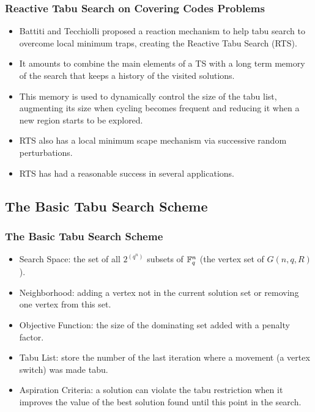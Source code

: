 \documentclass{beamer}
\begin{document}
\begin{frame}
  \frametitle{Reactive Tabu Search on Covering Codes Problems}
{
	
\begin{itemize}
    \item<1-> Battiti and Tecchiolli proposed a reaction mechanism to help tabu search to overcome local minimum traps, creating the Reactive Tabu Search (RTS).
    \item<2-> It amounts to combine the main elements of a TS with a long term memory of the search that keeps a history of the visited solutions.	
	\item<3-> This memory is used to dynamically control the size of the tabu list, augmenting its size when cycling becomes frequent and reducing it when a new region starts to be explored. 	
	\item<4-> RTS also has a local minimum scape mechanism via successive random perturbations.	
	\item<5-> RTS has had a reasonable success in several applications.
\end{itemize}
}
\end{frame}

\subsection{The Basic Tabu Search Scheme}

\begin{frame}
  \frametitle{The Basic Tabu Search Scheme}
{
	
\begin{itemize}
	\item<1-> Search Space: the set of all $2^{(q^n)}$ subsets of $\Bbb{F}_q^n$ (the vertex set of $G(n,q,R)$).
	\item<2-> Neighborhood: adding a vertex not in the current solution set or removing one vertex from this set.
	\item<3-> Objective Function: the size of the dominating set added with a penalty factor.
	\item<4-> Tabu List: store the number of the last iteration where a movement (a vertex switch) was made tabu.
	\item<5-> Aspiration Criteria: a solution can violate the tabu restriction when it improves the value of the best solution found until this point in the search.
\end{itemize}
}
\end{frame}
\end{document}

